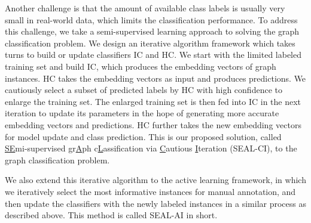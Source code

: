 \documentclass[sigconf]{acmart}
\newcommand{\eat}[1]{}
\begin{document}
\eat{
To solve this problem, one challenge is that hierarchical graph is a much too complicated input for a classifier, in which graph instances can be a set of variable-size graphs in real scenarios. To address this, we propose to build two classifiers, a classifier IC focusing on graph instances and a classifier HC focusing on hierarchical graph. IC is used to embed an arbitrary size of graph instance into a fixed-size embedding vector, then HC takes embedding vectors and the connections between graph instances as input, and outputs the predicted results. To enforce a consistency between the two classifiers, we design a disagreement loss to measure the degree of divergence between these two classifiers. For the design of IC, one challenge is how to encode the importance of different nodes into a unified embedding vector. In this work, we develop a new graph embedding method named Self-Attentive graph Embedding (SAGE) and learn the importance of different nodes via Self-Attentive mechanism, which is inspired by the recent success of ~\cite{DBLP:journals/corr/LinFSYXZB17} in sentence embedding, and derive the graph representation discriminatively according to the task at hand.
}


Another challenge is that the amount of available class labels is usually very small in real-world data, which limits the classification performance.  To address this challenge, we take a semi-supervised learning approach to solving the graph classification problem.  We design an iterative algorithm framework which takes turns to build or update classifiers IC and HC.  We start with the limited labeled training set and build IC, which produces the embedding vectors of graph instances.  HC takes the embedding vectors as input and produces predictions.  We cautiously select a subset of predicted labels by HC with high confidence to enlarge the training set.  The enlarged training set is then fed into IC in the next iteration to update its parameters in the hope of generating more accurate embedding vectors and predictions.  HC further takes the new embedding vectors for model update and class prediction.  This is our proposed solution, called \underline{SE}mi-supervised gr\underline{A}ph c\underline{L}assification via \underline{C}autious \underline{I}teration (SEAL-CI), to the graph classification problem.

We also extend this iterative algorithm to the active learning framework, in which we iteratively select the most informative instances for manual annotation, and then update the classifiers with the newly labeled instances in a similar process as described above.  This method is called SEAL-AI in short.
\end{document}
